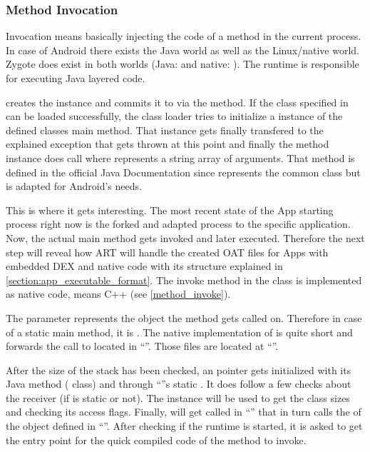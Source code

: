 \subsubsection{Method Invocation}\label{cl_loading}
Invocation means basically injecting the code of a method in the current process.
In case of Android there exists the Java world as well as the Linux/native world.
Zygote does exist in both worlds (Java: 
and native: ). The runtime is responsible for
executing Java layered code.

 creates the  instance and commits it to
 via the  method. If the class specified
in  can be loaded successfully, the class loader tries to initialize a
 instance of the defined classes main method.
That instance  gets finally transfered to the explained exception that gets thrown
at this point and finally the method instance  does call
 where  represents a string array of
arguments. That method is defined in the official Java Documentation \parencite{java_method} since  represents the common  class but is adapted for Android's needs.

This is where it gets interesting. The most recent state of the App starting process
right now is the forked and adapted process to the specific application. Now, the actual main
method gets invoked and later executed. Therefore the next step will reveal how ART will handle the created OAT files for Apps with embedded DEX and native code with its structure explained in \autoref{section:app_executable_format}. The invoke method in the  class is implemented as native code, means C++ (see \autoref{method_invoke}).

The  parameter represents the object the method gets called on. Therefore
in case of a static main method, it is . The native implementation of 
is quite short and forwards the call to  located in
``''. Those files are located at ``''.

After the size of the stack has been checked, an  pointer gets initialized with its Java method ( class) and through ``''s static . It does follow a few checks about the receiver (if  is static or
not). The  instance will be used to get the class sizes and checking
its access flags. Finally,  will get called in
``'' that in turn calls the  of the
 object defined in ``''.
After checking if the runtime is started, it is asked to get
the entry point for the quick compiled code of the method to invoke.



